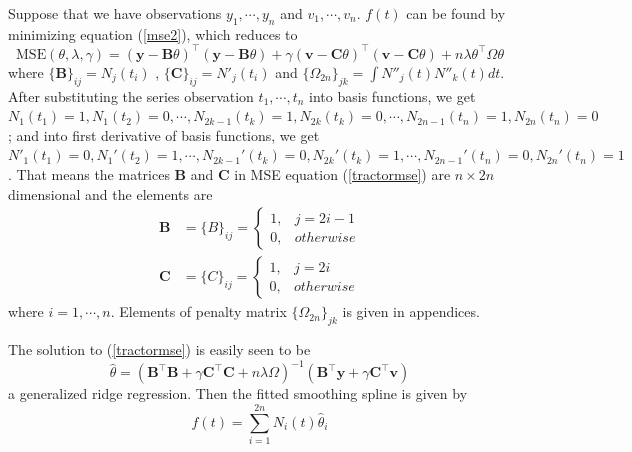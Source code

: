 Suppose that we have observations $y_1,\cdots,y_n$ and $v_1,\cdots,v_n$. $f(t)$ can be found by minimizing equation (\ref{mse2}), which reduces to
\begin{equation}\label{tractormse}
\text{MSE}(\theta, \lambda,\gamma) = (\mathbf{y}-\mathbf{B}\theta)^\top (\mathbf{y}-\mathbf{B}\theta) +\gamma (\mathbf{v}-\mathbf{C}\theta)^\top (\mathbf{v}-\mathbf{C}\theta)+n\lambda \theta^\top\Omega\theta
\end{equation}
where $\{\mathbf{B}\}_{ij} = N_j(t_i)$ , $\{\mathbf{C}\}_{ij} = N'_j(t_i)$ and $\{\Omega_{2n} \}_{jk}=\int N''_j(t)N''_k(t)dt$. After substituting the series observation $t_1, \cdots, t_n$ into basis functions, we get $N_1(t_1)=1, N_1(t_2)=0, \cdots, N_{2k-1}(t_{k})=1, N_{2k}(t_{k})=0, \cdots, N_{2n-1}(t_n)=1, N_{2n}(t_n)=0$; and into first derivative of basis functions, we get $N'_1(t_1)=0, N_1'(t_2)=1, \cdots, N_{2k-1}'(t_{k})=0, N_{2k}'(t_{k})=1, \cdots, N_{2n-1}'(t_n)=0, N_{2n}'(t_n)=1$. That means the matrices $\mathbf{B}$ and $\mathbf{C}$ in MSE equation (\ref{tractormse}) are $n \times 2n$ dimensional and the elements are
\begin{align}
\mathbf{B}&=\{B\}_{ij}=\begin{cases}
1, & j=2i-1\\
0, & otherwise
\end{cases}\\
\mathbf{C}&=\{C\}_{ij}=\begin{cases}
1, & j=2i\\
0, & otherwise
\end{cases}
\end{align}
where $i=1, \cdots, n$.  Elements of penalty matrix $\{\Omega_{2n} \}_{jk}$ is given in appendices. 

The solution to (\ref{tractormse}) is easily seen to be
\begin{equation}\label{thetahat}
\hat{\theta}=(\mathbf{B}^\top\mathbf{B}+\gamma\mathbf{C}^\top\mathbf{C}+n\lambda\Omega)^{-1}(\mathbf{B}^\top\mathbf{y}+\gamma\mathbf{C}^\top\mathbf{v})
\end{equation}
a generalized ridge regression. Then the fitted smoothing spline is given by
\begin{equation}
\hat{f}(t)=\sum_{i=1}^{2n}N_i(t)\hat{\theta}_i
\end{equation}

